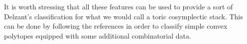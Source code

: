 \documentclass[
  a4paper, 
  reqno, 
  oneside, 
  12pt
]{amsart}
\theoremstyle{definition}
\theoremstyle{remark}
\begin{document}
It is worth stressing that all these features can be used to provide a sort of Delzant's classification for what we would call a toric cosymplectic stack. This can be done by following the references \cite{BazzoniGoertsches2,Hoffman} in order to classify simple convex polytopes equipped with some additional combinatorial data.

 
\end{document}
